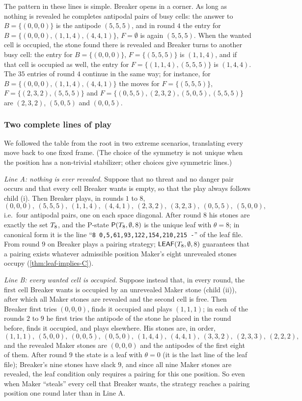 The pattern in these lines is simple. Breaker opens in a corner. As long as nothing is revealed he
completes antipodal pairs of busy cells: the answer to $B=\{(0,0,0)\}$ is the antipode $(5,5,5)$, and in
round $4$ the entry for $B=\{(0,0,0),(1,1,4),(4,4,1)\}$, $F=\emptyset$ is again $(5,5,5)$. When the wanted
cell is occupied, the stone found there is revealed and Breaker turns to another busy cell: the entry
for $B=\{(0,0,0)\}$, $F=\{(5,5,5)\}$ is $(1,1,4)$, and if that cell is occupied as well, the entry for
$F=\{(1,1,4),(5,5,5)\}$ is $(1,4,4)$. The $35$ entries of round $4$ continue in the same way; for instance,
for $B=\{(0,0,0),(1,1,4),(4,4,1)\}$ the moves for $F=\{(5,5,5)\}$, $F=\{(2,3,2),(5,5,5)\}$ and
$F=\{(0,5,5),(2,3,2),(5,0,5),(5,5,5)\}$ are $(2,3,2)$, $(5,0,5)$ and $(0,0,5)$.

\subsubsection*{Two complete lines of play}
We followed the table from the root in two extreme scenarios, translating every move back to one fixed
frame. (The choice of the symmetry is not unique when the position has a non-trivial stabilizer; other
choices give symmetric lines.)

\emph{Line A: nothing is ever revealed.} Suppose that no threat and no danger pair occurs and that every
cell Breaker wants is empty, so that the play always follows child (i). Then Breaker plays, in rounds $1$
to $8$,
\[
(0,0,0),\ (5,5,5),\ (1,1,4),\ (4,4,1),\ (2,3,2),\ (3,2,3),\ (0,5,5),\ (5,0,0),
\]
i.e.\ four antipodal pairs, one on each space diagonal. After round $8$ his stones are exactly the set
$T_8$, and the P-state $\mathsf{P}(T_8,\emptyset,8)$ is the unique leaf with $\theta=8$; in canonical
form it is the line ``\texttt{8 0,5,61,93,122,154,210,215 -}'' of the leaf file. From round $9$ on
Breaker plays a pairing strategy; $\mathsf{LEAF}(T_8,\emptyset,8)$ guarantees that a pairing exists whatever
admissible position Maker's eight unrevealed stones occupy (\cref{thm:leaf-implies-C}).

\emph{Line B: every wanted cell is occupied.} Suppose instead that, in every round, the first cell Breaker
wants is occupied by an unrevealed Maker stone (child (ii)), after which all Maker stones are revealed and
the second cell is free. Then Breaker first tries $(0,0,0)$, finds it occupied and plays $(1,1,1)$; in
each of the rounds $2$ to $9$ he first tries the antipode of the stone he placed in the round before, finds
it occupied, and plays elsewhere. His stones are, in order,
\[
(1,1,1),\ (5,0,0),\ (0,0,5),\ (0,5,0),\ (1,4,4),\ (4,4,1),\ (3,3,2),\ (2,3,3),\ (2,2,2),
\]
and the revealed Maker stones are $(0,0,0)$ and the antipodes of the first eight of them. After round $9$
the state is a leaf with $\theta=0$ (it is the last line of the leaf file); Breaker's nine stones have
slack $9$, and since all nine Maker stones are revealed, the leaf condition only requires a pairing for this
one position. So even when Maker ``steals'' every cell that Breaker wants, the strategy reaches a pairing
position one round later than in Line A.

